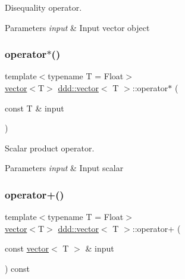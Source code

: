 Disequality operator. 


\begin{DoxyParams}{Parameters}
{\em input} & Input vector object \\
\hline
\end{DoxyParams}
\mbox{\label{classddd_1_1vector_a9ba05f9c13f8d9cd23f5a5657fcfa948}} 
\subsubsection{\texorpdfstring{operator$\ast$()}{operator*()}}
{\footnotesize\ttfamily template$<$typename T = Float$>$ \\
\hyperlink{classddd_1_1vector}{vector}$<$T$>$ \hyperlink{classddd_1_1vector}{ddd\+::vector}$<$ T $>$\+::operator$\ast$ (\begin{DoxyParamCaption}\item[{const T \&}]{input }\end{DoxyParamCaption})\hspace{0.3cm}{\ttfamily [inline]}}



Scalar product operator. 


\begin{DoxyParams}{Parameters}
{\em input} & Input scalar \\
\hline
\end{DoxyParams}
\mbox{\label{classddd_1_1vector_a03e9624cbd1f3fa29247c1a67a8678d9}} 
\subsubsection{\texorpdfstring{operator+()}{operator+()}}
{\footnotesize\ttfamily template$<$typename T = Float$>$ \\
\hyperlink{classddd_1_1vector}{vector}$<$T$>$ \hyperlink{classddd_1_1vector}{ddd\+::vector}$<$ T $>$\+::operator+ (\begin{DoxyParamCaption}\item[{const \hyperlink{classddd_1_1vector}{vector}$<$ T $>$ \&}]{input }\end{DoxyParamCaption}) const\hspace{0.3cm}{\ttfamily [inline]}}



